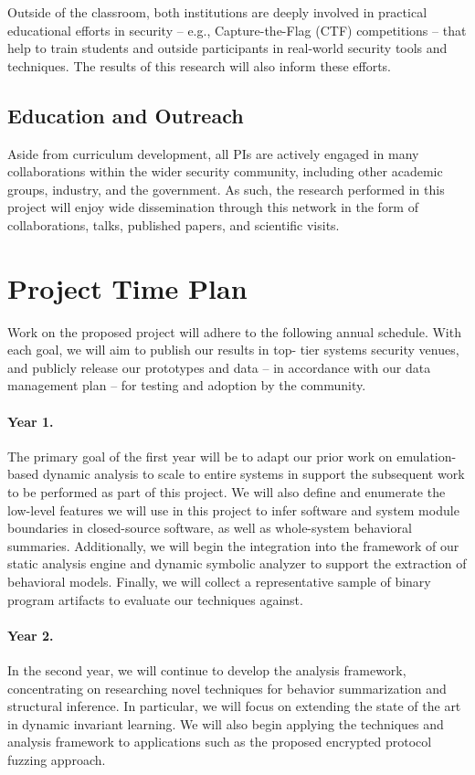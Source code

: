 \documentclass[letterpaper,twoside,11pt,headings=small]{scrartcl}
\begin{document}
Outside of the classroom, both institutions are deeply involved in practical
educational efforts in security -- e.g., Capture-the-Flag (CTF) competitions --
that help to train students and outside participants in real-world security
tools and techniques.  The results of this research will also inform these
efforts.

\subsection{Education and Outreach}
\label{sec:impact:education}

Aside from curriculum development, all PIs are actively engaged in many
collaborations within the wider security community, including other academic
groups, industry, and the government.  As such, the research performed in this
project will enjoy wide dissemination through this network in the form of
collaborations, talks, published papers, and scientific visits.

\section{Project Time Plan}
\label{sec:time-plan}

Work on the proposed project will adhere to the following annual schedule.
With each goal, we will aim to publish our results in top- tier systems
security venues, and publicly release our prototypes and data -- in accordance
with our data management plan -- for testing and adoption by the community.

\paragraph{Year 1.} The primary goal of the first year will be to adapt our
prior work on emulation-based dynamic analysis to scale to entire systems in
support the subsequent work to be performed as part of this project. We will
also define and enumerate the low-level features we will use in this project
to infer software and system module boundaries in closed-source software, as
well as whole-system behavioral summaries. Additionally, we will begin the
integration into the framework of our static analysis engine and dynamic
symbolic analyzer to support the extraction of behavioral models.  Finally, we
will collect a representative sample of binary program artifacts to evaluate
our techniques against.

\paragraph{Year 2.} In the second year, we will continue to develop the
analysis framework, concentrating on researching novel techniques for behavior
summarization and structural inference.  In particular, we will focus on
extending the state of the art in dynamic invariant learning.  We will also
begin applying the techniques and analysis framework to applications such
as the proposed encrypted protocol fuzzing approach.
\end{document}
